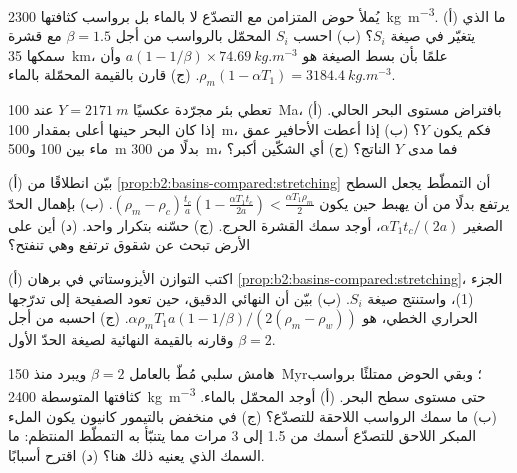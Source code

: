 \begin{exercise}[$\star\star$]\label{exo:b2:basins-compared:8}
يُملأ حوض  المتزامن مع التصدّع لا بالماء بل برواسب كثافتها
\qty{2300}{kg.m^{-3}}. (أ) ما الذي يتغيّر في صيغة $S_i$؟ (ب) احسب $S_i$ المحمّل بالرواسب
من أجل $\beta = 1.5$ مع قشرة سمكها \qty{35}{km}، علمًا بأن بسط الصيغة هو
$a(1 - 1/\beta)\times\qty{74.69}{kg.m^{-3}}$ وأن $\rho_m(1 - \alpha T_1) =
\qty{3184.4}{kg.m^{-3}}$. (ج) قارن بالقيمة المحمّلة بالماء.
\end{exercise}

\begin{exercise}[$\star\star$]\label{exo:b2:basins-compared:9}
تعطي بئر مجرّدة عكسيًا $Y = \qty{2171}{m}$ عند \qty{100}{Ma}، بافتراض مستوى البحر الحالي. (أ)
إذا كان البحر حينها أعلى بمقدار \qty{100}{m}، فكم يكون $Y$؟ (ب) إذا أعطت الأحافير عمق ماء
بين 100 و\qty{500}{m} بدلًا من \qty{300}{m}، فما مدى $Y$ الناتج؟ (ج) أي
الشكّين أكبر؟
\end{exercise}

\begin{exercise}[$\star\star\star$]\label{exo:b2:basins-compared:10}
(أ) بيّن انطلاقًا من \cref{prop:b2:basins-compared:stretching} أن التمطّط يجعل السطح يرتفع
بدلًا من أن يهبط حين يكون $(\rho_m - \rho_c)\frac{t_c}{a}\left(1 - \frac{\alpha T_1 t_c}{2a}\right) <
\frac{\alpha T_1\rho_m}{2}$. (ب) بإهمال الحدّ الصغير $\alpha T_1 t_c/(2a)$، أوجد
سمك القشرة الحرج. (ج) حسّنه بتكرار واحد. (د) أين على الأرض تبحث
عن شقوق ترتفع وهي تنفتح؟
\end{exercise}

\begin{exercise}[$\star\star\star$]\label{exo:b2:basins-compared:11}
(أ) اكتب التوازن الأيزوستاتي في برهان \cref{prop:b2:basins-compared:stretching}، الجزء
(1)، واستنتج صيغة $S_i$. (ب) بيّن أن  النهائي الدقيق، حين
تعود الصفيحة إلى تدرّجها الحراري الخطي، هو $\alpha\rho_m T_1 a(1 - 1/\beta)/(2(\rho_m -
\rho_w))$. (ج) احسبه من أجل $\beta = 2$ وقارنه بالقيمة النهائية
لصيغة الحدّ الأول.
\end{exercise}

\begin{exercise}[$\star\star\star$]\label{exo:b2:basins-compared:12}
هامش سلبي مُطّ بالعامل $\beta = 2$ ويبرد منذ \qty{150}{Myr}؛ وبقي
الحوض ممتلئًا برواسب كثافتها المتوسطة \qty{2400}{kg.m^{-3}} حتى مستوى سطح البحر.
(أ) أوجد  المحمّل بالماء. (ب) ما سمك الرواسب اللاحقة للتصدّع؟
(ج) في منخفض بالتيمور كانيون يكون الملء المبكر اللاحق للتصدّع أسمك من 1.5 إلى 3 مرات مما
يتنبّأ به التمطّط المنتظم: ما السمك الذي يعنيه ذلك هنا؟ (د) اقترح أسبابًا.
\end{exercise}

